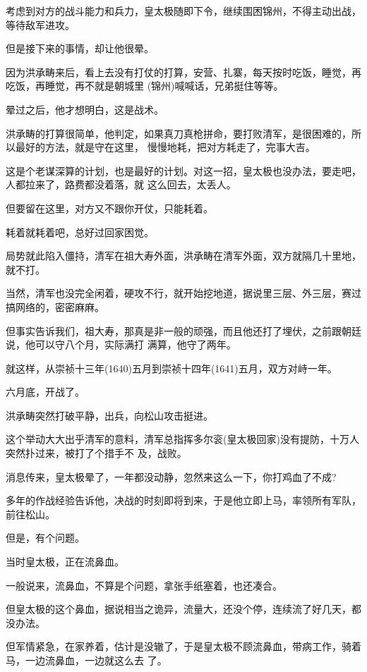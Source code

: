\documentclass[11pt,a4paper,onecolumn]{article}
\begin{document}
考虑到对方的战斗能力和兵力，皇太极随即下令，继续围困锦州，不得主动出战，等待敌军进攻。

但是接下来的事情，却让他很晕。

因为洪承畴来后，看上去没有打仗的打算，安营、扎寨，每天按时吃饭，睡觉，再吃饭，再睡觉，再不就是朝城里
(锦州)喊喊话，兄弟挺住等等。

晕过之后，他才想明白，这是战术。

洪承畴的打算很简单，他判定，如果真刀真枪拼命，要打败清军，是很困难的，所以最好的方法，就是守在这里，
慢慢地耗，把对方耗走了，完事大吉。

这是个老谋深算的计划，也是最好的计划。对这一招，皇太极也没办法，要走吧，人都拉来了，路费都没着落，就
这么回去，太丢人。

但要留在这里，对方又不跟你开仗，只能耗着。

耗着就耗着吧，总好过回家困觉。

局势就此陷入僵持，清军在祖大寿外面，洪承畴在清军外面，双方就隔几十里地，就不打。

当然，清军也没完全闲着，硬攻不行，就开始挖地道，据说里三层、外三层，赛过搞网络的，密密麻麻。

但事实告诉我们，祖大寿，那真是非一般的顽强，而且他还打了埋伏，之前跟朝廷说，他可以守八个月，实际满打
满算，他守了两年。

就这样，从崇祯十三年(1640)五月到崇祯十四年(1641)五月，双方对峙一年。

六月底，开战了。

洪承畴突然打破平静，出兵，向松山攻击挺进。

这个举动大大出乎清军的意料，清军总指挥多尔衮(皇太极回家)没有提防，十万人突然扑过来，被打了个措手不
及，战败。

消息传来，皇太极晕了，一年都没动静，忽然来这么一下，你打鸡血了不成?

多年的作战经验告诉他，决战的时刻即将到来，于是他立即上马，率领所有军队，前往松山。

但是，有个问题。

当时皇太极，正在流鼻血。

一般说来，流鼻血，不算是个问题，拿张手纸塞着，也还凑合。

但皇太极的这个鼻血，据说相当之诡异，流量大，还没个停，连续流了好几天，都没办法。

但军情紧急，在家养着，估计是没辙了，于是皇太极不顾流鼻血，带病工作，骑着马，一边流鼻血，一边就这么去
了。

\section[\thesection]{}
\end{document}
